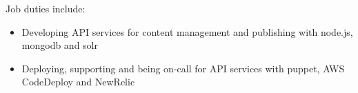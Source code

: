 \normalsize
Job duties include:
\small
\begin{itemize}
    \item Developing API services for content management and publishing with node.js, mongodb and solr
    \item Deploying, supporting and being on-call for API services with puppet, AWS CodeDeploy and NewRelic
\end{itemize}
\normalsize
\medskip

